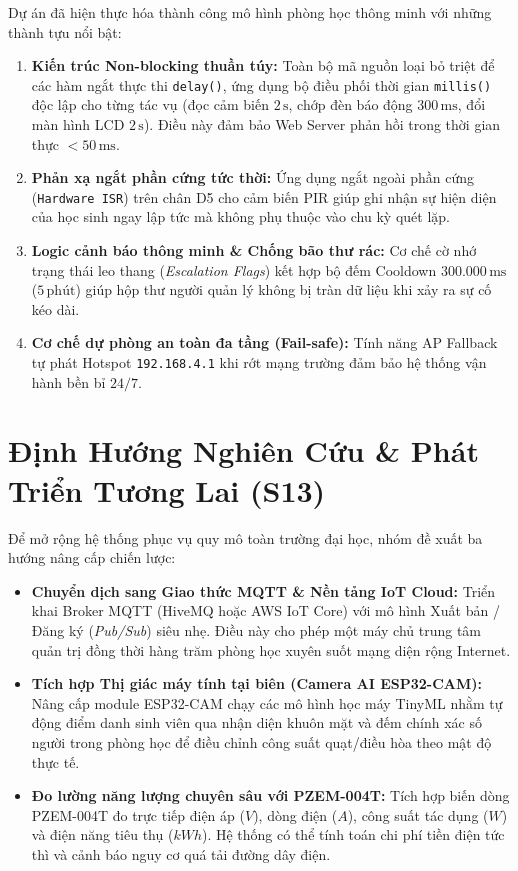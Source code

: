 \documentclass[12pt,a4paper]{article}
\begin{document}
Dự án đã hiện thực hóa thành công mô hình phòng học thông minh với những thành tựu nổi bật:
\begin{enumerate}
    \item \textbf{Kiến trúc Non-blocking thuần túy:} Toàn bộ mã nguồn loại bỏ triệt để các hàm ngắt thực thi \texttt{delay()}, ứng dụng bộ điều phối thời gian \texttt{millis()} độc lập cho từng tác vụ (đọc cảm biến $2\,\text{s}$, chớp đèn báo động $300\,\text{ms}$, đổi màn hình LCD $2\,\text{s}$). Điều này đảm bảo Web Server phản hồi trong thời gian thực $< 50\,\text{ms}$.
    \item \textbf{Phản xạ ngắt phần cứng tức thời:} Ứng dụng ngắt ngoài phần cứng (\texttt{Hardware ISR}) trên chân D5 cho cảm biến PIR giúp ghi nhận sự hiện diện của học sinh ngay lập tức mà không phụ thuộc vào chu kỳ quét lặp.
    \item \textbf{Logic cảnh báo thông minh \& Chống bão thư rác:} Cơ chế cờ nhớ trạng thái leo thang (\textit{Escalation Flags}) kết hợp bộ đếm Cooldown $300.000\,\text{ms}$ ($5\,\text{phút}$) giúp hộp thư người quản lý không bị tràn dữ liệu khi xảy ra sự cố kéo dài.
    \item \textbf{Cơ chế dự phòng an toàn đa tầng (Fail-safe):} Tính năng AP Fallback tự phát Hotspot \texttt{192.168.4.1} khi rớt mạng trường đảm bảo hệ thống vận hành bền bỉ $24/7$.
\end{enumerate}

\section{Định Hướng Nghiên Cứu \& Phát Triển Tương Lai (S13)}

Để mở rộng hệ thống phục vụ quy mô toàn trường đại học, nhóm đề xuất ba hướng nâng cấp chiến lược:
\begin{itemize}
    \item \textbf{Chuyển dịch sang Giao thức MQTT \& Nền tảng IoT Cloud:} Triển khai Broker MQTT (HiveMQ hoặc AWS IoT Core) với mô hình Xuất bản / Đăng ký (\textit{Pub/Sub}) siêu nhẹ. Điều này cho phép một máy chủ trung tâm quản trị đồng thời hàng trăm phòng học xuyên suốt mạng diện rộng Internet.
    \item \textbf{Tích hợp Thị giác máy tính tại biên (Camera AI ESP32-CAM):} Nâng cấp module ESP32-CAM chạy các mô hình học máy TinyML nhằm tự động điểm danh sinh viên qua nhận diện khuôn mặt và đếm chính xác số người trong phòng học để điều chỉnh công suất quạt/điều hòa theo mật độ thực tế.
    \item \textbf{Đo lường năng lượng chuyên sâu với PZEM-004T:} Tích hợp biến dòng PZEM-004T đo trực tiếp điện áp ($V$), dòng điện ($A$), công suất tác dụng ($W$) và điện năng tiêu thụ ($kWh$). Hệ thống có thể tính toán chi phí tiền điện tức thì và cảnh báo nguy cơ quá tải đường dây điện.
\end{itemize}
\end{document}
